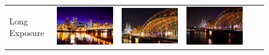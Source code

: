 \begin{figure}
\begin{tabular}{m{.01\linewidth} m{.16\linewidth} m{.16\linewidth} m{.16\linewidth} m{.16\linewidth} m{.16\linewidth}}
    \begin{turn}{90}{Long Exposure}\end{turn} &
    \includegraphics[width=\linewidth]{../style/figures/flickr_on_flickr/pred_style_Long_Exposure/0.jpg} &
    \includegraphics[width=\linewidth]{../style/figures/flickr_on_flickr/pred_style_Long_Exposure/1.jpg} &
    \includegraphics[width=\linewidth]{../style/figures/flickr_on_flickr/pred_style_Long_Exposure/2.jpg} &

\end{tabular}
\end{figure}
